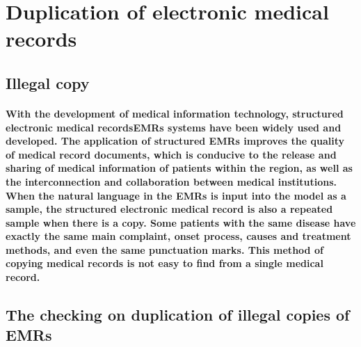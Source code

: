 \documentclass{article}
\begin{document}








\section{Duplication of electronic medical records}

\subsection{Illegal copy}
\paragraph{With the development of medical information technology, structured electronic medical recordsEMRs systems have been widely used and developed.
The application of structured EMRs improves the quality of medical record documents, which is conducive to the release and sharing of medical information of patients within the region, as well as the interconnection and collaboration between medical institutions. When the natural language in the EMRs is input into the model as a sample, the structured electronic medical record is also a repeated sample when there is a copy. Some patients with the same disease have exactly the same main complaint, onset process, causes and treatment methods, and even the same punctuation marks. This method of copying medical records is not easy to find from a single medical record.}
\subsection{The checking on duplication of illegal copies of EMRs }
\end{document}
